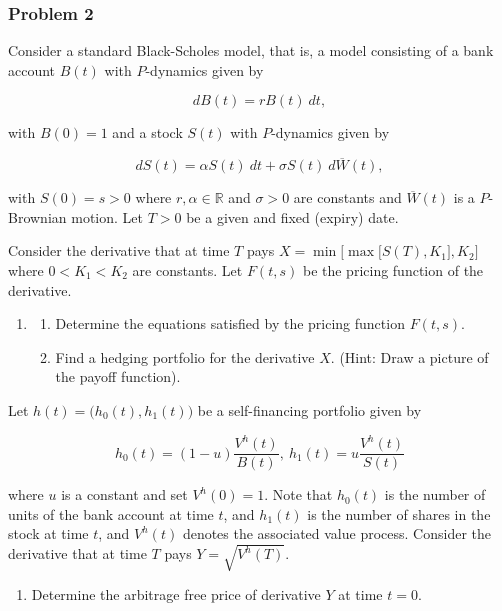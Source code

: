 \documentclass[
]{article}
\providecommand{\tightlist}{%
  \setlength{\itemsep}{0pt}\setlength{\parskip}{0pt}}
\begin{document}
\hypertarget{problem-2}{%
\subsubsection{Problem 2}\label{problem-2}}

Consider a standard Black-Scholes model, that is, a model consisting of
a bank account \(B(t)\) with \(P\)-dynamics given by

\[
dB(t)=rB(t)\ dt,
\]

with \(B(0)=1\) and a stock \(S(t)\) with \(P\)-dynamics given by

\[
dS(t)=\alpha S(t)\ dt+\sigma S(t)\ d\overline{W}(t),
\]

with \(S(0)=s>0\) where \(r,\alpha\in\mathbb{R}\) and \(\sigma >0\) are
constants and \(\overline{W}(t)\) is a \(P\)-Brownian motion. Let
\(T>0\) be a given and fixed (expiry) date.

Consider the derivative that at time \(T\) pays
\(X=\min\Big[\max\Big[S(T),K_1\Big],K_2\Big]\) where \(0<K_1<K_2\) are
constants. Let \(F(t,s)\) be the pricing function of the derivative.

\begin{enumerate}
\def\labelenumi{\alph{enumi}.}
\item
  \begin{enumerate}
  \def\labelenumii{\roman{enumii}.}
  \tightlist
  \item
    Determine the equations satisfied by the pricing function
    \(F(t,s)\).
  \item
    Find a hedging portfolio for the derivative \(X\). (Hint: Draw a
    picture of the payoff function).
  \end{enumerate}
\end{enumerate}

Let \(h(t)=\Big(h_0(t),h_1(t)\Big)\) be a self-financing portfolio given
by

\[
h_0(t)=(1-u)\frac{V^h(t)}{B(t)},\ h_1(t)=u\frac{V^h(t)}{S(t)}
\]

where \(u\) is a constant and set \(V^h(0)=1\). Note that \(h_0(t)\) is
the number of units of the bank account at time \(t\), and \(h_1(t)\) is
the number of shares in the stock at time \(t\), and \(V^h(t)\) denotes
the associated value process. Consider the derivative that at time \(T\)
pays \(Y=\sqrt{V^h(T)}\).

\begin{enumerate}
\def\labelenumi{\alph{enumi}.}
\setcounter{enumi}{1}
\tightlist
\item
  Determine the arbitrage free price of derivative \(Y\) at time
  \(t=0\).
\end{enumerate}
\end{document}
